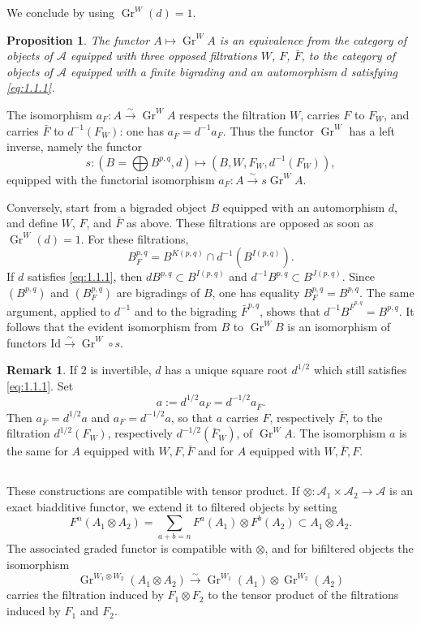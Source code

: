 \documentclass[12pt,a4paper]{article}
\theoremstyle{plain}
\newtheorem{proposition}[lemma]{Proposition}
\theoremstyle{definition}
\newtheorem{remark}[lemma]{Remark}
\DeclareMathOperator{\Gr}{Gr}
\newcommand{\A}{\mathcal{A}}
\begin{document}
We conclude by using $\Gr^W(d)=1$.

\begin{proposition}\label{prop:1.2}
The functor $A\mapsto \Gr^W\!A$ is an equivalence from the category of objects of $\A$ equipped with three opposed filtrations $W$, $F$, $\bar F$, to the category of objects of $\A$ equipped with a finite bigrading and an automorphism $d$ satisfying \eqref{eq:1.1.1}.
\end{proposition}

The isomorphism $a_F:A\xrightarrow{\sim}\Gr^W\!A$ respects the filtration $W$, carries $F$ to $F_W$, and carries $\bar F$ to $d^{-1}(F_W)$: one has $a_{\bar F}=d^{-1}a_F$. Thus the functor $\Gr^W$ has a left inverse, namely the functor
\[
s:(B=\bigoplus B^{p,q},d)\longmapsto (B,W,F_W,d^{-1}(F_W)),
\]
equipped with the functorial isomorphism $a_F:A\xrightarrow{\sim}s\Gr^W\!A$.

Conversely, start from a bigraded object $B$ equipped with an automorphism $d$, and define $W$, $F$, and $\bar F$ as above. These filtrations are opposed as soon as $\Gr^W(d)=1$. For these filtrations,
\[
B_F^{p,q}=B^{K(p,q)}\cap d^{-1}(B^{I(p,q)}).
\]
If $d$ satisfies \eqref{eq:1.1.1}, then $dB^{p,q}\subset B^{I(p,q)}$ and $d^{-1}B^{p,q}\subset B^{J(p,q)}$. Since $(B^{p,q})$ and $(B_F^{p,q})$ are bigradings of $B$, one has equality $B_F^{p,q}=B^{p,q}$. The same argument, applied to $d^{-1}$ and to the bigrading $\bar F^{p,q}$, shows that $d^{-1}B^{\bar F^{p,q}}=B^{p,q}$. It follows that the evident isomorphism from $B$ to $\Gr^W\!B$ is an isomorphism of functors $\mathrm{Id}\xrightarrow{\sim}\Gr^W\circ s$.

\begin{remark}\label{rem:1.3}
If $2$ is invertible, $d$ has a unique square root $d^{1/2}$ which still satisfies \eqref{eq:1.1.1}. Set
\[
a:=d^{1/2}a_F=d^{-1/2}a_{\bar F}.
\]
Then $a_{\bar F}=d^{1/2}a$ and $a_F=d^{-1/2}a$, so that $a$ carries $F$, respectively $\bar F$, to the filtration $d^{1/2}(F_W)$, respectively $d^{-1/2}(\bar F_W)$, of $\Gr^W\!A$. The isomorphism $a$ is the same for $A$ equipped with $W,F,\bar F$ and for $A$ equipped with $W,\bar F,F$.
\end{remark}

\subsection{}

These constructions are compatible with tensor product. If $\otimes:\A_1\times\A_2\to\A$ is an exact biadditive functor, we extend it to filtered objects by setting
\[
F^n(A_1\otimes A_2)=\sum_{a+b=n}F^a(A_1)\otimes F^b(A_2)\subset A_1\otimes A_2.
\]
The associated graded functor is compatible with $\otimes$, and for bifiltered objects the isomorphism
\[
\Gr^{W_1\otimes W_2}(A_1\otimes A_2)\xrightarrow{\sim}\Gr^{W_1}(A_1)\otimes\Gr^{W_2}(A_2)
\]
carries the filtration induced by $F_1\otimes F_2$ to the tensor product of the filtrations induced by $F_1$ and $F_2$.
\end{document}

